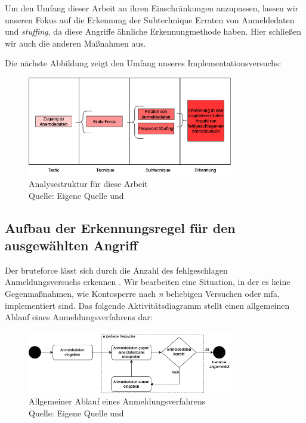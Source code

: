 Um den Umfang dieser Arbeit an ihren Einschränkungen anzupassen, lassen wir unseren Fokus auf die Erkennung der Subtechnique Erraten von Anmeldedaten und \textit{\gls{stuffing}}, da diese Angriffe ähnliche Erkennungmethode haben. Hier schließen wir auch die anderen Maßnahmen aus.

\newpage
Die nächste Abbildung zeigt den Umfang unseres Implementationsversuchs:

\begin{figure}[H]
   \centering
   \includegraphics[width=0.8\textwidth]{assets/T1110.drawio.png}
   \caption{Analysestruktur für diese Arbeit  \\Quelle: Eigene Quelle und \citep{Mitre_t1110}}
   \centering
\end{figure}

\subsection{Aufbau der Erkennungsregel für den ausgewählten Angriff}
Der \gls{bruteforce} lässt sich durch die Anzahl des fehlgeschlagen Anmeldungsversuchs erkennen \citep{Selvaganesh_SplunkBruteForce}. Wir bearbeiten eine Situation, in der es keine Gegenmaßnahmen, wie Kontosperre nach \textit{n} beliebigen Versuchen oder \gls{mfa}, implementiert sind. Das folgende Aktivitätsdiagramm stellt einen allgemeinen Ablauf eines Anmeldungsverfahrens dar:

\begin{figure}[H]
   \centering
   \includegraphics[width=0.8\textwidth]{assets/Anmeldeverfahren.drawio.png}
   \caption{Allgemeiner Ablauf eines Anmeldungsverfahrens \\Quelle: Eigene Quelle und \citep{Selvaganesh_SplunkBruteForce}}
   \centering
\end{figure}

